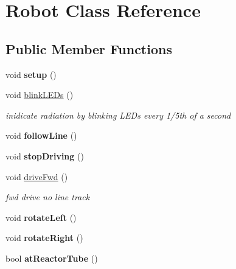 \hypertarget{classRobot}{\section{Robot Class Reference}
\label{classRobot}
}
\subsection*{Public Member Functions}
\begin{DoxyCompactItemize}
\item 
\hypertarget{classRobot_a1fc37e3c329d59795f6adf44199d4df9}{void {\bfseries setup} ()}\label{classRobot_a1fc37e3c329d59795f6adf44199d4df9}

\item 
\hypertarget{classRobot_a4215f7e880311c2118f387df75effaf2}{void \hyperlink{classRobot_a4215f7e880311c2118f387df75effaf2}{blink\-L\-E\-Ds} ()}\label{classRobot_a4215f7e880311c2118f387df75effaf2}

\begin{DoxyCompactList}\small\item\em inidicate radiation by blinking L\-E\-Ds every 1/5th of a second \end{DoxyCompactList}\item 
\hypertarget{classRobot_a6e3caf6e0346f6a54557eb57a79fc4f4}{void {\bfseries follow\-Line} ()}\label{classRobot_a6e3caf6e0346f6a54557eb57a79fc4f4}

\item 
\hypertarget{classRobot_a959f64b4829ade78bb332f205b50ee70}{void {\bfseries stop\-Driving} ()}\label{classRobot_a959f64b4829ade78bb332f205b50ee70}

\item 
\hypertarget{classRobot_a35897f5e7b5c8b29cc6d386c6089abea}{void \hyperlink{classRobot_a35897f5e7b5c8b29cc6d386c6089abea}{drive\-Fwd} ()}\label{classRobot_a35897f5e7b5c8b29cc6d386c6089abea}

\begin{DoxyCompactList}\small\item\em fwd drive no line track \end{DoxyCompactList}\item 
\hypertarget{classRobot_a82a61a1f5fb4a17fd2277329bc6e8fe4}{void {\bfseries rotate\-Left} ()}\label{classRobot_a82a61a1f5fb4a17fd2277329bc6e8fe4}

\item 
\hypertarget{classRobot_a33e931c5ce2e2ce940c96203f1b6d057}{void {\bfseries rotate\-Right} ()}\label{classRobot_a33e931c5ce2e2ce940c96203f1b6d057}

\item 
\hypertarget{classRobot_a9183b1dd60c7d39bf6c8ecea5690b22c}{bool {\bfseries at\-Reactor\-Tube} ()}\label{classRobot_a9183b1dd60c7d39bf6c8ecea5690b22c}

\end{DoxyCompactItemize}
